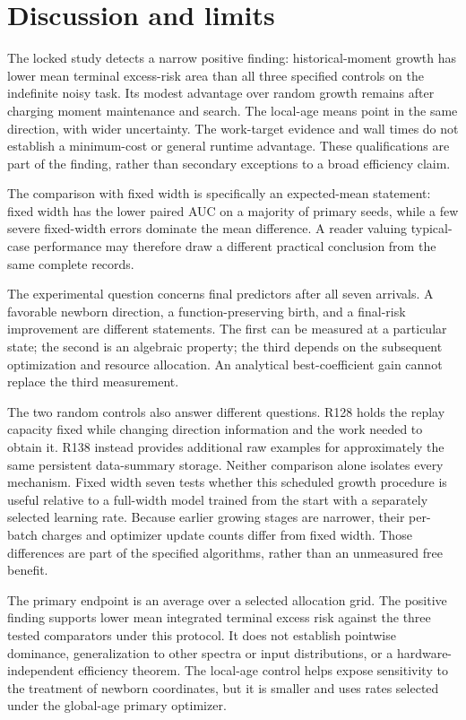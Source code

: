 \documentclass[10pt]{article}
\begin{document}
\section{Discussion and limits}
\label{sec:discussion}

The locked study detects a narrow positive finding: historical-moment
growth has lower mean terminal excess-risk area than all three
specified controls on the indefinite noisy task. Its modest advantage
over random growth remains after charging moment maintenance and
search. The local-age means point in the same direction, with wider
uncertainty. The work-target evidence and wall times do not establish
a minimum-cost or general runtime advantage. These qualifications
are part of the finding, rather than secondary exceptions to a broad
efficiency claim.

The comparison with fixed width is specifically an expected-mean
statement: fixed width has the lower paired AUC on a majority of
primary seeds, while a few severe fixed-width errors dominate the
mean difference. A reader valuing typical-case performance may
therefore draw a different practical conclusion from the same
complete records.

The experimental question concerns final predictors after all seven
arrivals. A favorable newborn direction, a function-preserving birth,
and a final-risk improvement are different statements. The first can
be measured at a particular state; the second is an algebraic
property; the third depends on the subsequent optimization and
resource allocation. An analytical best-coefficient gain cannot
replace the third measurement.

The two random controls also answer different questions. R128 holds
the replay capacity fixed while changing direction information and
the work needed to obtain it. R138 instead provides additional raw
examples for approximately the same persistent data-summary storage.
Neither comparison alone isolates every mechanism. Fixed width seven
tests whether this scheduled growth procedure is useful relative to
a full-width model trained from the start with a separately selected
learning rate. Because earlier growing stages are narrower, their
per-batch charges and optimizer update counts differ from fixed width.
Those differences are part of the specified algorithms, rather than
an unmeasured free benefit.

The primary endpoint is an average over a selected allocation grid.
The positive finding supports lower mean integrated terminal
excess risk against the three tested comparators under this protocol.
It does not establish pointwise dominance, generalization
to other spectra or input distributions, or a hardware-independent
efficiency theorem. The local-age control helps expose sensitivity
to the treatment of newborn coordinates, but it is smaller and uses
rates selected under the global-age primary optimizer.
\end{document}

